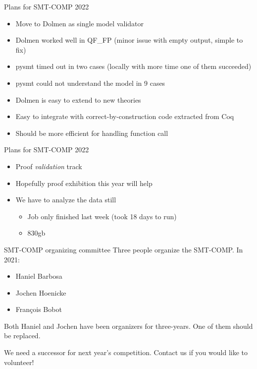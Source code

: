 \documentclass[table]{beamer}
\newcommand\vitem{\vfill\item}
\begin{document}
\begin{frame}{Plans for SMT-COMP 2022}
  \begin{itemize}
    \item Move to Dolmen as single model validator

      \vitem Dolmen worked well in QF\_FP (minor issue with empty output, simple
      to fix)
      \vitem pysmt timed out in two cases (locally with more time one of them
      succeeded)
      \vitem pysmt could not understand the model in 9 cases
      \vitem Dolmen is easy to extend to new theories
      \vitem Easy to integrate with correct-by-construction code extracted from
      Coq
      \vitem Should be more efficient for handling function call

  \end{itemize}


\end{frame}

\begin{frame}{Plans for SMT-COMP 2022}
  \begin{itemize}
    \item Proof \textit{validation} track

      \vitem Hopefully proof exhibition this year will help

      \vitem We have to analyze the data still
      \begin{itemize}
        \item Job only finished last week (took 18 days to run)
        \item 830gb
      \end{itemize}

  \end{itemize}


\end{frame}

\begin{frame}{SMT-COMP organizing committee}
  Three people organize the SMT-COMP.  In 2021:
  \begin{itemize}
  \item Haniel Barbosa
  \item Jochen Hoenicke
  \item Fran\c{c}ois Bobot
  \end{itemize}

  Both Haniel and Jochen have been organizers for three-years. One of them
  should be replaced.
  \bigskip

  We need a successor for next year's competition.
  Contact us if you would like to volunteer!
\end{frame}
\end{document}
